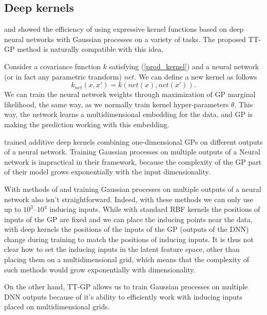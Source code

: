 \subsection{Deep kernels}

  \citet{wilson2016stochastic} and \citet{wilson2016deep} showed the efficiency
  of using expressive kernel functions based on deep neural networks with
  Gaussian processes on a variety of tasks. The proposed TT-GP method is
  naturally compatible with this idea.

  Consider a covariance function $k$ satisfying (\ref{prod_kernel}) and
  a neural network (or in fact any parametric transform) $net$. We can define a
  new kernel as follows
  \[
    k_{net}(x, x') = k(net(x), net(x')).
  \]
  We can train the neural network weights through maximization of GP marginal
  likelihood, the same way, as we normally train kernel hyper-parameters $\theta$.
  This way, the network learns a multidimensional embedding for the data, and
  GP is making the prediction working with this embedding.
  
  \citet{wilson2016stochastic} trained additive deep kernels combining 
  one-dimensional GPs on different outputs of a neural network. Training
  Gaussian processes on multiple outputs of a Neural network is impractical
  in their framework, because the complexity of the GP part of their model
  grows exponentially with the input dimensionality. 

  With methods of \citet{hensman2013} and \citet{hensman2015} training Gaussian
  processes on multiple outputs of a neural network also isn't straightforward. Indeed,
  with these methods we can only use up to $10^3$--$10^4$ inducing inputs. While
  with standard RBF kernels the positions of inputs of the GP are fixed and we can place 
  the inducing points near the data, with deep kernels the positions of the
  inputs of the GP (outputs of the DNN) change during training to match the positions of inducing inputs.
  It is thus not clear how to set the inducing inputs in the latent feature space, other
  than placing them on a multidimensional grid, which means that the complexity
  of such methods would grow exponentially with dimensionality.

  On the other hand, TT-GP allows us to train Gaussian processes on multiple DNN
  outputs because of it's ability to efficiently work with inducing inputs 
  placed on multidimensional grids.

